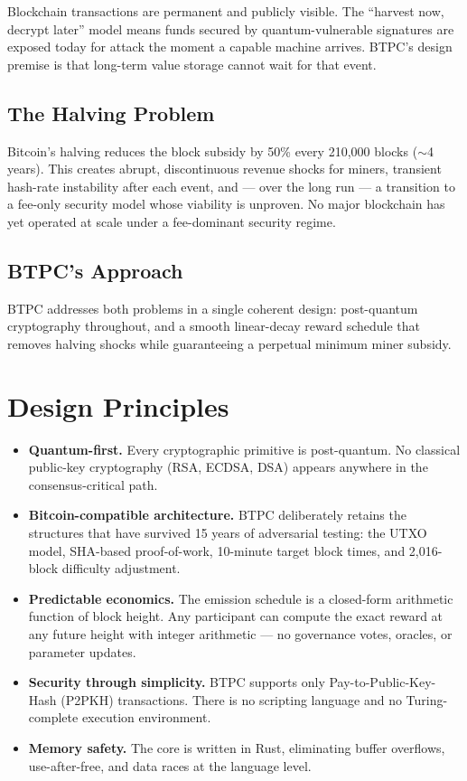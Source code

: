 \documentclass[11pt,a4paper]{article}
\begin{document}
Blockchain transactions are permanent and publicly visible. The ``harvest now, decrypt later'' model means funds secured by quantum-vulnerable signatures are exposed today for attack the moment a capable machine arrives. BTPC's design premise is that long-term value storage cannot wait for that event.

\subsection{The Halving Problem}

Bitcoin's halving reduces the block subsidy by 50\% every 210{,}000 blocks ($\sim$4 years). This creates abrupt, discontinuous revenue shocks for miners, transient hash-rate instability after each event, and --- over the long run --- a transition to a fee-only security model whose viability is unproven. No major blockchain has yet operated at scale under a fee-dominant security regime.

\subsection{BTPC's Approach}

BTPC addresses both problems in a single coherent design: post-quantum cryptography throughout, and a smooth linear-decay reward schedule that removes halving shocks while guaranteeing a perpetual minimum miner subsidy.

\section{Design Principles}

\begin{itemize}[leftmargin=1.5em,itemsep=2pt]
\item \textbf{Quantum-first.} Every cryptographic primitive is post-quantum. No classical public-key cryptography (RSA, ECDSA, DSA) appears anywhere in the consensus-critical path.
\item \textbf{Bitcoin-compatible architecture.} BTPC deliberately retains the structures that have survived 15 years of adversarial testing: the UTXO model, SHA-based proof-of-work, 10-minute target block times, and 2{,}016-block difficulty adjustment.
\item \textbf{Predictable economics.} The emission schedule is a closed-form arithmetic function of block height. Any participant can compute the exact reward at any future height with integer arithmetic --- no governance votes, oracles, or parameter updates.
\item \textbf{Security through simplicity.} BTPC supports only Pay-to-Public-Key-Hash (P2PKH) transactions. There is no scripting language and no Turing-complete execution environment.
\item \textbf{Memory safety.} The core is written in Rust, eliminating buffer overflows, use-after-free, and data races at the language level.
\end{itemize}
\end{document}
